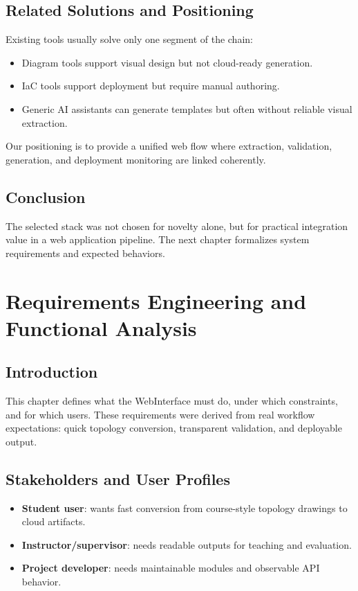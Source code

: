\documentclass[12pt,a4paper,openany]{report}
\begin{document}
\section{Related Solutions and Positioning}

Existing tools usually solve only one segment of the chain:
\begin{itemize}
    \item Diagram tools support visual design but not cloud-ready generation.
    \item IaC tools support deployment but require manual authoring.
    \item Generic AI assistants can generate templates but often without reliable visual extraction.
\end{itemize}

Our positioning is to provide a unified web flow where extraction, validation, generation, and deployment monitoring are linked coherently.

\section{Conclusion}

The selected stack was not chosen for novelty alone, but for practical integration value in a web application pipeline. The next chapter formalizes system requirements and expected behaviors.

\chapter{Requirements Engineering and Functional Analysis}

\section{Introduction}

This chapter defines what the WebInterface must do, under which constraints, and for which users. These requirements were derived from real workflow expectations: quick topology conversion, transparent validation, and deployable output.

\section{Stakeholders and User Profiles}

\begin{itemize}
    \item \textbf{Student user}: wants fast conversion from course-style topology drawings to cloud artifacts.
    \item \textbf{Instructor/supervisor}: needs readable outputs for teaching and evaluation.
    \item \textbf{Project developer}: needs maintainable modules and observable API behavior.
\end{itemize}
\end{document}
